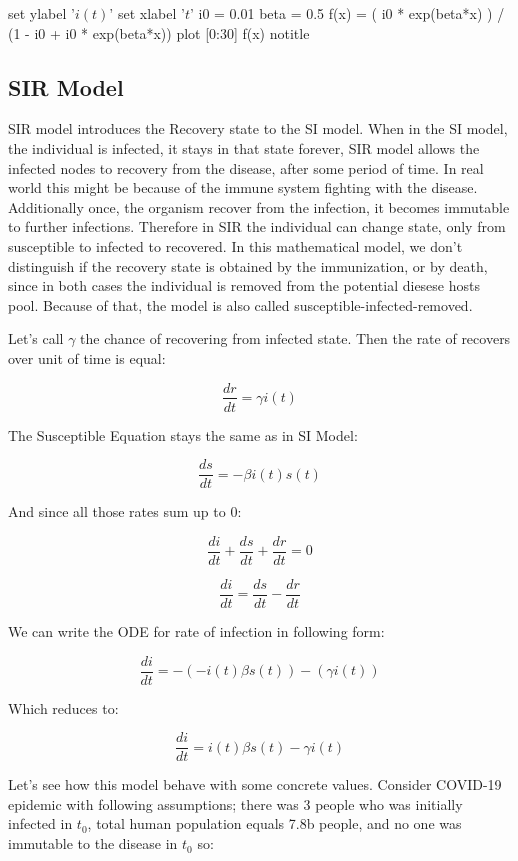 \documentclass[nostrict]{szablonPG}
\begin{document}
\begin{gnuplot}[scale=0.8]
	set ylabel '$i(t)$'
	set xlabel '$t$'
	i0 = 0.01
	beta = 0.5
	f(x) = ( i0 * exp(beta*x) ) / (1 - i0 + i0 * exp(beta*x))
	plot [0:30] f(x) notitle
\end{gnuplot}

\subsection{SIR Model}

SIR model introduces the Recovery state to the SI model. When in the SI model, the individual is infected, it stays in that state forever, SIR model allows the infected nodes to recovery from the disease, after some period of time. In real world this might be because of the immune system fighting with the disease. Additionally once, the organism recover from the infection, it becomes immutable to further infections. Therefore in SIR the individual can change state, only from susceptible to infected to recovered. In this mathematical model, we don't distinguish if the recovery state is obtained by the immunization, or  by death, since in both cases the individual is removed from the potential diesese hosts pool. Because of that, the model is also called susceptible-infected-removed.

Let's call $\gamma$ the chance of recovering from infected state. Then the rate of recovers over unit of time is equal:

\[\frac{dr}{dt} = \gamma i(t)\]

The Susceptible Equation stays the same as in SI Model:

\[\frac{ds}{dt} = -\beta i(t) s(t)\]

And since all those rates sum up to 0:

\[\frac{di}{dt} + \frac{ds}{dt} + \frac{dr}{dt} = 0\]

\[\frac{di}{dt} = \frac{ds}{dt} - \frac{dr}{dt}\]

We can write the ODE for rate of infection in following form:

\[\frac{di}{dt} = -(- i(t) \beta s(t)) - (\gamma i(t))\]

Which reduces to:

\[\frac{di}{dt} = i(t) \beta s(t) - \gamma i(t)\]


Let's see how this model behave with some concrete values.  Consider COVID-19 epidemic with following assumptions; there was 3 people who was initially infected in $t_0$, total human population equals 7.8b people, and no one was immutable to the disease in $t_0$ so:
\end{document}
